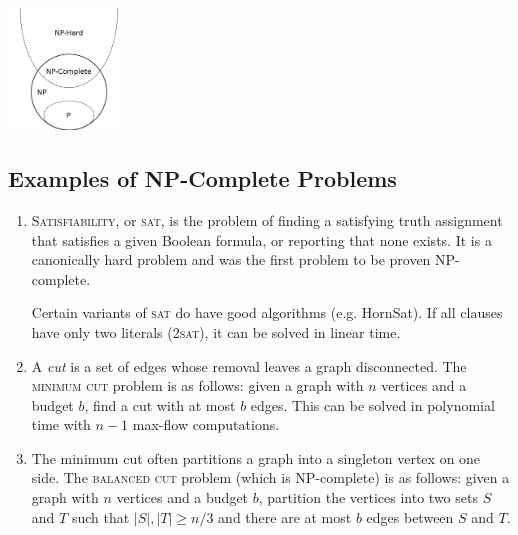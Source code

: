 \documentclass[10pt]{article}
\begin{document}
\begin{multicols}{2}
\begin{addmargin}[0.8em]{0.5em}
\begin{enumerate}[label=(\alph*)]
    \vspace{-0.2cm}
    \begin{center}
    \includegraphics[width=3cm]{np_euler.png}
    \end{center}
    \vspace{-0.4cm}
    \end{enumerate}
    
    \vspace{-0.4cm}
    \subsection{Examples of NP-Complete Problems}
    \vspace{-0.2cm}
    \begin{enumerate}[label=(\alph*)]
        \item \textsc{Satisfiability}, or \textsc{sat}, is the problem of finding a satisfying truth assignment that satisfies a given Boolean formula, or reporting that none exists. It is a canonically hard problem and was the first problem to be proven NP-complete.
        
        Certain variants of \textsc{sat} do have good algorithms (e.g. HornSat). If all clauses have only two literals (\textsc{2sat}), it can be solved in linear time. 
        
        \item A \textit{cut} is a set of edges whose removal leaves a graph disconnected. The \textsc{minimum cut} problem is as follows: given a graph with $n$ vertices and a budget $b$, find a cut with at most $b$ edges. This can be solved in polynomial time with $n - 1$ max-flow computations.
        
        \item The minimum cut often partitions a graph into a singleton vertex on one side. The \textsc{balanced cut} problem (which is NP-complete) is as follows: given a graph with $n$ vertices and a budget $b$, partition the vertices into two sets $S$ and $T$ such that $|S|,|T| \geq n / 3$ and there are at most $b$ edges between $S$ and $T$.        
        

\end{enumerate}
\end{addmargin}
\end{multicols}
\end{document}
